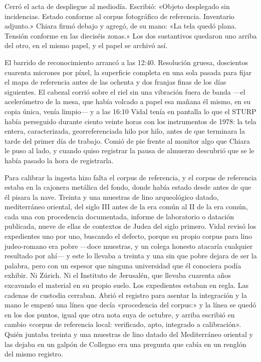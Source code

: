 Cerró el acta de despliegue al mediodía. Escribió: «Objeto desplegado sin incidencias. Estado conforme al corpus fotográfico de referencia. Inventario adjunto.» Chiara firmó debajo y agregó, de su mano: «La tela quedó plana. Tensión conforme en las dieciséis zonas.» Los dos sustantivos quedaron uno arriba del otro, en el mismo papel, y el papel se archivó así.

El barrido de reconocimiento arrancó a las 12:40. Resolución gruesa, doscientos cuarenta micrones por píxel, la superficie completa en una sola pasada para fijar el mapa de referencia antes de las ochenta y dos franjas finas de los días siguientes. El cabezal corrió sobre el riel sin una vibración fuera de banda ---el acelerómetro de la mesa, que había volcado a papel esa mañana él mismo, en su copia única, venía limpio--- y a las 16:10 Vidal tenía en pantalla lo que el STURP había perseguido durante ciento veinte horas con los instrumentos de 1978: la tela entera, caracterizada, georreferenciada hilo por hilo, antes de que terminara la tarde del primer día de trabajo. Comió de pie frente al monitor algo que Chiara le puso al lado, y cuando quiso registrar la pausa de almuerzo descubrió que se le había pasado la hora de registrarla.

Para calibrar la ingesta hizo falta el corpus de referencia, y el corpus de referencia estaba en la cajonera metálica del fondo, donde había estado desde antes de que él pisara la nave. Treinta y una muestras de lino arqueológico datado, mediterráneo oriental, del siglo III antes de la era común al II de la era común, cada una con procedencia documentada, informe de laboratorio o datación publicada, nueve de ellas de contextos de Judea del siglo primero. Vidal revisó los expedientes uno por uno, buscando el defecto, porque su propio corpus para lino judeo-romano era pobre ---doce muestras, y un colega honesto atacaría cualquier resultado por ahí--- y este lo llevaba a treinta y una sin que pobre dejara de ser la palabra, pero con un espesor que ninguna universidad que él conociera podía exhibir. Ni Zúrich. Ni el Instituto de Jerusalén, que llevaba cuarenta años excavando el material en su propio suelo. Los expedientes estaban en regla. Las cadenas de custodia cerraban. Abrió el registro para asentar la integración y la mano le empezó una línea que decía «procedencia del corpus:» y la línea se quedó en los dos puntos, igual que otra nota suya de octubre, y arriba escribió en cambio «corpus de referencia local: verificado, apto, integrado a calibración». Quién juntaba treinta y una muestras de lino datado del Mediterráneo oriental y las dejaba en un galpón de Collegno era una pregunta que cabía en un renglón del mismo registro.

